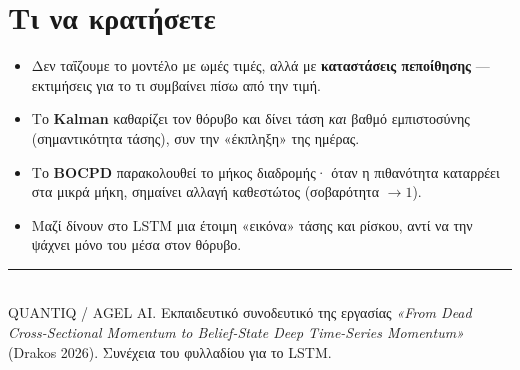 \documentclass[11pt]{article}
\begin{document}
\section*{Τι να κρατήσετε}
\begin{itemize}[nosep,leftmargin=1.4em]
\item Δεν ταΐζουμε το μοντέλο με ωμές τιμές, αλλά με \textbf{καταστάσεις πεποίθησης} --- εκτιμήσεις για το τι συμβαίνει πίσω από την τιμή.
\item Το \textbf{Kalman} καθαρίζει τον θόρυβο και δίνει τάση \emph{και} βαθμό εμπιστοσύνης (σημαντικότητα τάσης), συν την «έκπληξη» της ημέρας.
\item Το \textbf{BOCPD} παρακολουθεί το μήκος διαδρομής· όταν η πιθανότητα καταρρέει στα μικρά μήκη, σημαίνει αλλαγή καθεστώτος (σοβαρότητα $\to 1$).
\item Μαζί δίνουν στο LSTM μια έτοιμη «εικόνα» τάσης και ρίσκου, αντί να την ψάχνει μόνο του μέσα στον θόρυβο.
\end{itemize}

\vfill
\noindent\rule{\linewidth}{0.4pt}\\[2pt]
{\small QUANTIQ / AGEL AI. Εκπαιδευτικό συνοδευτικό της εργασίας \emph{«From Dead Cross-Sectional
Momentum to Belief-State Deep Time-Series Momentum»} (Drakos 2026). Συνέχεια του φυλλαδίου για το LSTM.}
\end{document}
